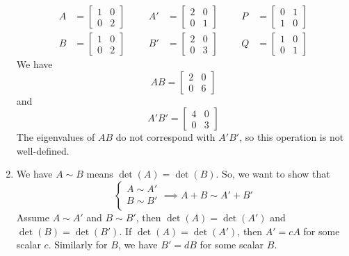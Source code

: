 \documentclass[openany]{report}
\begin{document}
\begin{enumerate}[label=(\alph*)]
    \begin{align*}
        A &= \begin{bmatrix}
            1 & 0 \\
            0 & 2
        \end{bmatrix} &&&  A' &= \begin{bmatrix}
            2 & 0 \\
            0 & 1
        \end{bmatrix} &&&
        P &= \begin{bmatrix}
            0 & 1 \\
            1 & 0
        \end{bmatrix}\\
        B &= \begin{bmatrix}
            1 & 0 \\
            0 & 2
        \end{bmatrix} &&& B' &= \begin{bmatrix}
            2 & 0 \\
            0 & 3
        \end{bmatrix} &&& Q &= \begin{bmatrix}
            1 & 0 \\
            0 & 1
        \end{bmatrix}
    \end{align*}
    We have 
    \[AB = \begin{bmatrix}
        2 & 0 \\
        0 & 6
    \end{bmatrix}\]
    and 
    \[A'B' = \begin{bmatrix}
        4 & 0\\
        0 & 3
    \end{bmatrix}\]
    The eigenvalues of $AB$ do not correspond with $A'B'$, so this operation is not well-defined. 
    \item We have $A \sim B$ means $\det(A) = \det(B)$. So, we want to show that 
    \[\begin{cases}
        A \sim A' \\
        B \sim B' \\
    \end{cases} \implies 
        A + B \sim A' + B'
    \]
    Assume $A \sim A'$ and $B \sim B'$, then $\det(A) = \det(A')$ and $\det(B) = \det(B')$. If $\det(A) = \det(A')$, then $A' = cA$ for some scalar $c$. Similarly for $B$, we have $B' = dB$ for some scalar $B$. 
    
\end{enumerate}
\end{document}
